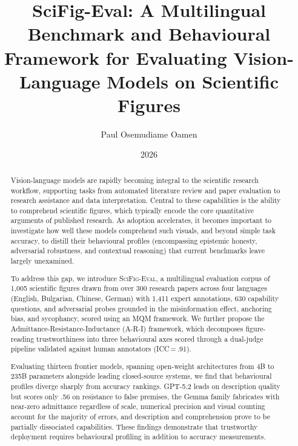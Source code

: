 \documentclass[MSc]{abdnthesis}
\title{SciFig-Eval: A Multilingual Benchmark and
       Behavioural Framework for Evaluating Vision-Language
       Models on Scientific Figures}
\author{Paul Osemudiame Oamen}
\date{2026}
\begin{document}

\maketitle
\makedeclaration


\begin{abstract}
  Vision-language models are rapidly becoming integral to the scientific
  research workflow, supporting tasks from automated literature review
  and paper evaluation to research assistance and data interpretation.
  Central to these capabilities is the ability to comprehend scientific
  figures, which typically encode the core quantitative arguments of
  published research. As adoption accelerates, it becomes important to
  investigate how well these models comprehend such visuals, and beyond
  simple task accuracy, to distill their behavioural profiles
  (encompassing epistemic honesty, adversarial robustness, and contextual
  reasoning) that current benchmarks leave largely unexamined.

  To address this gap, we introduce \textsc{SciFig-Eval}, a multilingual
  evaluation corpus of 1{,}005 scientific figures drawn from over 300
  research papers across four languages (English, Bulgarian, Chinese,
  German) with 1{,}411 expert annotations, 630 capability questions, and
  adversarial probes grounded in the misinformation effect, anchoring
  bias, and sycophancy, scored using an MQM framework. We further propose
  the Admittance-Resistance-Inductance (A-R-I) framework, which
  decomposes figure-reading trustworthiness into three behavioural axes
  scored through a dual-judge pipeline validated against human annotators
  (ICC\,=\,.91).

  Evaluating thirteen frontier models, spanning open-weight architectures
  from 4B to 235B parameters alongside leading closed-source systems, we
  find that behavioural profiles diverge sharply from accuracy rankings.
  GPT-5.2 leads on description quality but scores only .56 on resistance
  to false premises, the Gemma family fabricates with near-zero admittance
  regardless of scale, numerical precision and visual counting account for
  the majority of errors, and description and comprehension prove to be
  partially dissociated capabilities. These findings demonstrate that trustworthy deployment requires
  behavioural profiling in addition to accuracy measurements.
\end{abstract}
\end{document}
